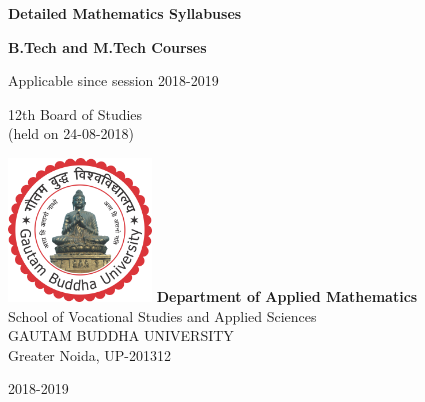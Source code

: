 \documentclass[11pt]{article}
\begin{document}
\pagecolor{blue!10}
\setlength{\parskip}{0.4em}
\begin{titlepage}
	
	\begin{center}
		{\Huge\bf Detailed Mathematics Syllabuses }
		
		
		\vspace{3cm}
		{\Huge\bf B.Tech and M.Tech Courses }
		
		\vspace{0.5cm}
		{\Large Applicable since session 2018-2019}
		
		\vspace{3cm}
		{\huge  12th Board of Studies }\\
		\vspace{0.5cm}
		{\Large (held on 24-08-2018)}
		
		\vfill
		\includegraphics[width=1.5in]{gbu_logo}	
		\vfill
		{\bf \LARGE {Department of Applied Mathematics}}\\
		{\Large {School of Vocational Studies  and Applied Sciences}}\\
		{\Large GAUTAM BUDDHA UNIVERSITY}\\
		{\Large Greater Noida, UP-201312}
		
		\vspace{1cm}
		{\huge 2018-2019}
	\end{center}
\end{titlepage}
\end{document}
